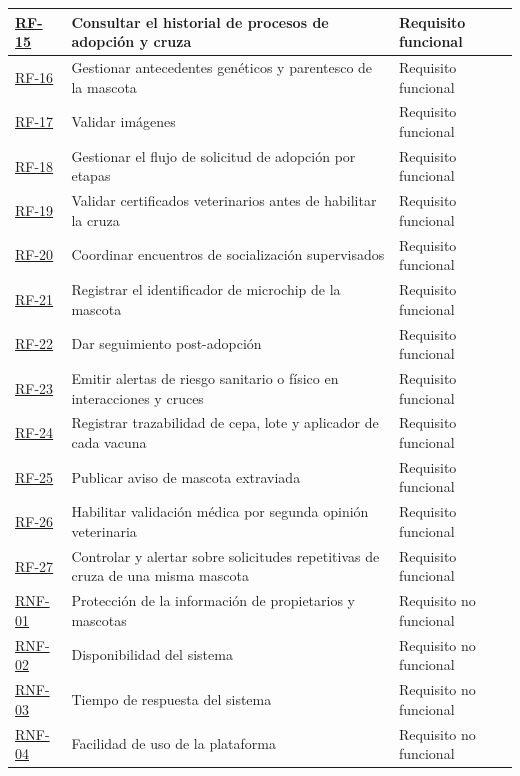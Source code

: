 \documentclass[journal,onecolumn]{IEEEtran}
\begin{document}
\begin{longtable}{@{}p{2.2cm} p{7.5cm} p{3.5cm}@{}}
		\hline
		\hyperref[tab:RF-15]{RF-15} & Consultar el historial de procesos de adopción y cruza & Requisito funcional \\
		\hline
		\hyperref[tab:RF-16]{RF-16} & Gestionar antecedentes genéticos y parentesco de la mascota & Requisito funcional \\
		\hline
		\hyperref[tab:RF-17]{RF-17} & Validar imágenes & Requisito funcional \\
		\hline
		\hyperref[tab:RF-18]{RF-18} & Gestionar el flujo de solicitud de adopción por etapas & Requisito funcional \\
		\hline
		\hyperref[tab:RF-19]{RF-19} & Validar certificados veterinarios antes de habilitar la cruza & Requisito funcional \\
		\hline
		\hyperref[tab:RF-20]{RF-20} & Coordinar encuentros de socialización supervisados & Requisito funcional \\
		\hline
		\hyperref[tab:RF-21]{RF-21} & Registrar el identificador de microchip de la mascota & Requisito funcional \\
		\hline
		\hyperref[tab:RF-22]{RF-22} & Dar seguimiento post-adopción & Requisito funcional \\
		\hline
		\hyperref[tab:RF-23]{RF-23} & Emitir alertas de riesgo sanitario o físico en interacciones y cruces & Requisito funcional \\
		\hline
		\hyperref[tab:RF-24]{RF-24} & Registrar trazabilidad de cepa, lote y aplicador de cada vacuna & Requisito funcional \\
		\hline
		\hyperref[tab:RF-25]{RF-25} & Publicar aviso de mascota extraviada & Requisito funcional \\
		\hline
		\hyperref[tab:RF-26]{RF-26} & Habilitar validación médica por segunda opinión veterinaria & Requisito funcional \\
		\hline
		\hyperref[tab:RF-27]{RF-27} & Controlar y alertar sobre solicitudes repetitivas de cruza de una misma mascota & Requisito funcional \\
		\hline
		\hyperref[tab:RNF-01]{RNF-01} & Protección de la información de propietarios y mascotas & Requisito no funcional \\
		\hline
		\hyperref[tab:RNF-02]{RNF-02} & Disponibilidad del sistema & Requisito no funcional \\
		\hline
		\hyperref[tab:RNF-03]{RNF-03} & Tiempo de respuesta del sistema & Requisito no funcional \\
		\hline
		\hyperref[tab:RNF-04]{RNF-04} & Facilidad de uso de la plataforma & Requisito no funcional \\

\end{longtable}
\end{document}
